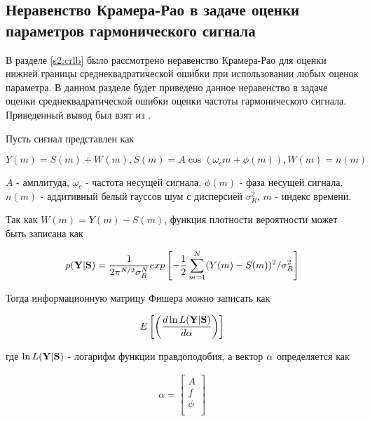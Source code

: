 \subsection{Неравенство Крамера-Рао в задаче оценки параметров гармонического сигнала}

В разделе \ref{s2:crlb} было рассмотрено неравенство Крамера-Рао для оценки нижней границы среднеквадратической ошибки
при использовании любых оценок параметра.
В данном разделе будет приведено данное неравенство в задаче оценки среднеквадратической ошибки оценки частоты
гармонического сигнала. Приведенный вывод был взят из \cite{skon-clrb-report, rife-crlb-article}.

Пусть сигнал представлен как
\begin{center}
\begin{equation}
	\label{eq:crlb3_signal}
	Y(m) = S(m) + W(m) ,
	S(m) = A\cos(\omega_{c}m + \phi(m)),
	W(m) = n(m)
\end{equation}
\end{center}
${A}$ - амплитуда, ${\omega_c}$ - частота несущей сигнала, ${\phi(m)}$ - фаза несущей сигнала, ${n(m)}$ - аддитивный белый гауссов шум
с дисперсией ${\sigma_R^2}$, ${m}$ - индекс времени.

Так как ${W(m) = Y(m) - S(m)}$, функция плотности вероятности может быть записана как
\begin{center}
\begin{equation}
	\label{eq:crlb3_gauss}
	p({\bf Y}|{\bf S}) = \frac{1}{2\pi^{N/2}\sigma_R^N}
		exp\left[ -\frac{1}{2} \sum \limits_{m=1}^N(Y(m) - S(m))^2 / \sigma_R^2 \right]
\end{equation}
\end{center}

Тогда информационную матрицу Фишера можно записать как
\begin{center}
\begin{equation}
	\label{eq:crlb3_fisher_matrix}
	E \left[ \left( \frac{d \ln L({\bf Y}|{\bf S})}{d {\bf \alpha}} \right)\right]
\end{equation}
\end{center}
где ${\ln L({\bf Y}|{\bf S})}$ - логарифм функции правдоподобия, а вектор ${{\bf \alpha}}$ определяется как
\begin{center}
\begin{eqnarray}
	\label{eq:crlb3_alpha}
		\alpha =
		\left[ \begin{array}{c}
		A \nonumber	\\
		f 		\\
		\phi		\\
		\end{array} \right]
\end{eqnarray}
\end{center}

